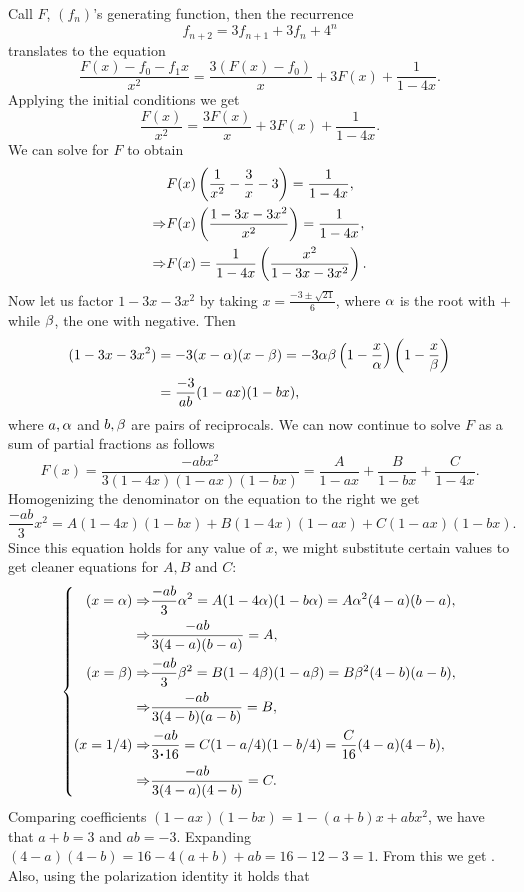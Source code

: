 \documentclass[12pt]{memoir}
\begin{document}
\begin{ptcbr}
\begin{enumerate}[i)]
   Call $F$, $(f_n)$'s generating function, then the recurrence 
   $$f_{n+2}=3f_{n+1}+3f_n+4^n$$
   translates to the equation 
   $$\frac{F(x)-f_0-f_1x}{x^2}=\frac{3(F(x)-f_0)}{x}+3F(x)+\frac{1}{1-4x}.$$
   Applying the initial conditions we get 
   $$\frac{F(x)}{x^2}=\frac{3F(x)}{x}+3F(x)+\frac{1}{1-4x}.$$
   We can solve for $F$ to obtain 
   \begin{align*}
      &F(x)\left(\frac{1}{x^2}-\frac{3}{x}-3\right)=\frac{1}{1-4x},\\
      \Rightarrow&F(x)\left(\frac{1-3x-3x^2}{x^2}\right)=\frac{1}{1-4x},\\
      \Rightarrow&F(x)=\frac{1}{1-4x}\left(\frac{x^2}{1-3x-3x^2}\right).\\
   \end{align*}
   Now let us factor $1-3x-3x^2$ by taking $x=\frac{-3\pm\sqrt{21}}{6}$, where $\alpha$ is the root with $+$ while $\beta$, the one with negative. Then 
   \begin{align*}
      (1-3x-3x^2)&=-3(x-\alpha)(x-\beta)=-3\alpha\beta\left(1-\frac{x}{\alpha}\right)\left(1-\frac{x}{\beta}\right)\\
      &=\frac{-3}{ab}(1-ax)(1-bx),
   \end{align*}
   where $a,\alpha$ and $b,\beta$ are pairs of reciprocals. We can now continue to solve $F$ as a sum of partial fractions as follows
   $$F(x)=\frac{-abx^2}{3(1-4x)(1-ax)(1-bx)}=\frac{A}{1-ax}+\frac{B}{1-bx}+\frac{C}{1-4x}.$$
   Homogenizing the denominator on the equation to the right we get
   $$\frac{-ab}{3}x^2=A(1-4x)(1-bx)+B(1-4x)(1-ax)+C(1-ax)(1-bx).$$
   Since this equation holds for any value of $x$, we might substitute certain values to get cleaner equations for $A,B$ and $C$:
   $$
\left\lbrace
\begin{aligned}
   (x=\al)\To&\frac{-ab}{3}\al^2=A(1-4\al)(1-b\al)=A\al^2(4-a)(b-a),\\
   \To&\frac{-ab}{3(4-a)(b-a)}=A,\\
   (x=\bt)\To&\frac{-ab}{3}\bt^2=B(1-4\bt)(1-a\bt)=B\bt^2(4-b)(a-b),\\
   \To&\frac{-ab}{3(4-b)(a-b)}=B,\\
   (x=1/4)\To&\frac{-ab}{3\.16}=C(1-a/4)(1-b/4)=\frac{C}{16}(4-a)(4-b),\\
   \To&\frac{-ab}{3(4-a)(4-b)}=C.\\
\end{aligned}
\right.
$$
Comparing coefficients $(1-ax)(1-bx)=1-(a+b)x+abx^2$, we have that $a+b=3$ and $ab=-3$. Expanding $(4-a)(4-b)=16-4(a+b)+ab=16-12-3=1$. From this we get . Also, using the polarization identity it holds that 

\end{enumerate}
\end{ptcbr}
\end{document}
